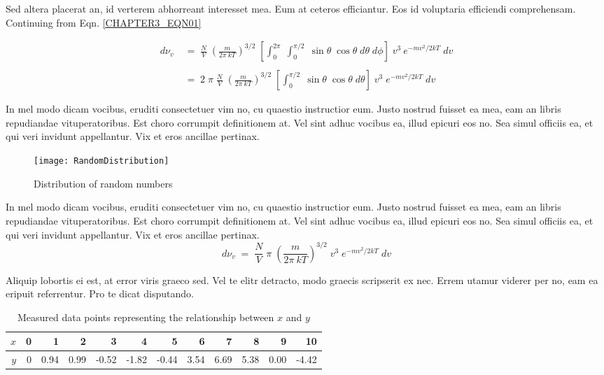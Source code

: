 Sed altera placerat an, id verterem abhorreant 
interesset mea. Eum at ceteros efficiantur. Eos id voluptaria efficiendi 
comprehensam. Continuing from Eqn. \eqref{CHAPTER3_EQN01}

\begin{align*}
  d\nu_v &\;=\; \frac{N}{V}\;\left(\frac{m}{2\pi\:kT} \right)^{3/2}\;
               \left[\int_{0}^{2\pi}\;\int_{0}^{\pi/2}\;\sin\theta\;\cos\theta\;d\theta\;d\phi \right]\;
               v^3\:e^{-mv^2/2kT}\;dv \\\\
         &\;=\; 2\;\pi\;\frac{N}{V}\;
               \left(\frac{m}{2\pi\:kT} \right)^{3/2}\;
               \left[\int_{0}^{\pi/2}\;\sin\theta\;\cos\theta\;d\theta \right]\;
               v^3\;e^{-mv^2/2kT}\;dv
\end{align*}

In mel modo dicam vocibus, eruditi consectetuer vim no, cu quaestio 
instructior eum. Justo nostrud fuisset ea mea, eam an libris repudiandae 
vituperatoribus. Est choro corrumpit definitionem at. Vel sint adhuc vocibus 
ea, illud epicuri eos no. Sea simul officiis ea, et qui veri invidunt 
appellantur. Vix et eros ancillae pertinax.
\begin{figure}[htb]
  \begin{center}
    \texttt{[image: RandomDistribution]}
  \end{center}
  \caption{Distribution of random numbers}
  \label{CHAPTER3_FIG01}
\end{figure}

In mel modo dicam vocibus, eruditi consectetuer vim no, cu quaestio 
instructior eum. Justo nostrud fuisset ea mea, eam an libris repudiandae 
vituperatoribus. Est choro corrumpit definitionem at. Vel sint adhuc vocibus 
ea, illud epicuri eos no. Sea simul officiis ea, et qui veri invidunt 
appellantur. Vix et eros ancillae pertinax.
\begin{equation}
  d\nu_v \;=\; \frac{N}{V}\;\pi\;
               \left(\frac{m}{2\pi\:kT} \right)^{3/2}\;
               v^3\;e^{-mv^2/2kT}\;dv
  \label{CHAPTER3_EQN02}
\end{equation}

Aliquip lobortis ei est, at error viris graeco sed. Vel te elitr detracto, 
modo graecis scripserit ex nec. Errem utamur viderer per no, eam ea eripuit 
referrentur. Pro te dicat disputando.

\begin{table}[hbt]
  \caption{Measured data points representing the relationship between $x$ and
    $y$}
  \begin{center}
    \begin{tabular}{r|rrrrrrrrrrr}
      \hline
      $x$ & 0 & 1 & 2 & 3 & 4 & 5 & 6 & 7 & 8 & 9 & 10\\
      \hline
      $y$ & 0 & 0.94 & 0.99 & -0.52 & -1.82 & -0.44 & 3.54 & 6.69 & 5.38 & 0.00 & -4.42\\
      \hline
    \end{tabular}
  \end{center}
  \label{CHAPTER3_TABLE01}
\end{table}

